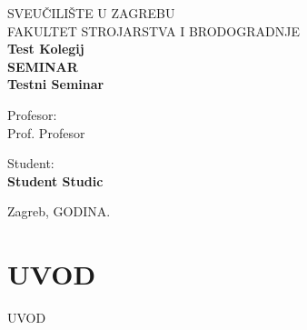 \documentclass[12pt,a4paper]{article}
\begin{document}
\begin{titlepage}
    \thispagestyle{empty}
    \centering
    {\fontsize{16pt}{19pt}\selectfont SVEUČILIŠTE U ZAGREBU\\}
    {\fontsize{16pt}{19pt}\selectfont FAKULTET STROJARSTVA I BRODOGRADNJE\\}
    \vfill
    {\fontsize{28pt}{34pt}\selectfont\bfseries Test Kolegij\\}
    \vspace{0.5cm}
    {\fontsize{28pt}{34pt}\selectfont\bfseries SEMINAR\\}
    \vspace{1.5cm}
    {\fontsize{16pt}{19pt}\selectfont\bfseries Testni Seminar\\}
    \vfill
    \noindent
    \begin{minipage}[t]{0.48\textwidth}
        \raggedright
        {\fontsize{14pt}{17pt}\selectfont Profesor:\\}
        {\fontsize{14pt}{17pt}\selectfont Prof. Profesor\\}
    \end{minipage}
    \hfill
    \begin{minipage}[t]{0.48\textwidth}
        \raggedleft
        {\fontsize{14pt}{17pt}\selectfont Student:\\}
        {\fontsize{14pt}{17pt}\selectfont\bfseries Student Studic\\}
    \end{minipage}
    \vspace{1cm}
    \begin{center}
        {\fontsize{14pt}{17pt}\selectfont Zagreb, {{GODINA}}.}
    \end{center}
\end{titlepage}


\tableofcontents
\newpage
\listoffigures
\newpage
\listoftables
\newpage


\section{UVOD}
{{UVOD}}
\end{document}
